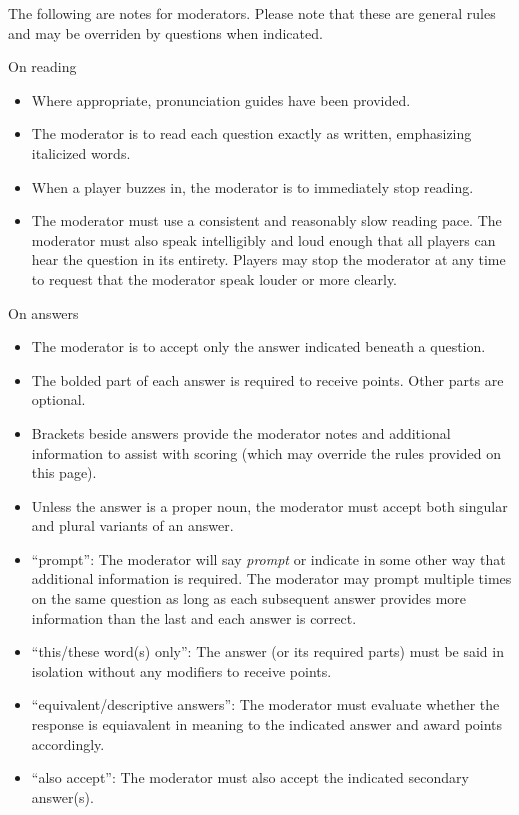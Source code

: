 \thispagestyle{empty}
The following are notes for moderators. Please note that these are general rules and may be overriden by questions when indicated.

\vspace*{0.3 cm}
On reading
\begin{itemize}
    \item Where appropriate, pronunciation guides have been provided.
    \item The moderator is to read each question exactly as written, emphasizing italicized words.
    \item When a player buzzes in, the moderator is to immediately stop reading.
    \item The moderator must use a consistent and reasonably slow reading pace. The moderator must also speak intelligibly and loud enough that all players can hear the question in its entirety. Players may stop the moderator at any time to request that the moderator speak louder or more clearly.
\end{itemize}

\vspace*{0.3 cm}
On answers
\begin{itemize}
    \item The moderator is to accept only the answer indicated beneath a question.
    \item The bolded part of each answer is required to receive points. Other parts are optional.
    \item Brackets beside answers provide the moderator notes and additional information to assist with scoring (which may override the rules provided on this page).
    \item Unless the answer is a proper noun, the moderator must accept both singular and plural variants of an answer. 
    \item ``prompt'': The moderator will say \textit{prompt} or indicate in some other way that additional information is required. The moderator may prompt multiple times on the same question as long as each subsequent answer provides more information than the last and each answer is correct.
    \item ``this/these word(s) only'': The answer (or its required parts) must be said in isolation without any modifiers to receive points.
    \item ``equivalent/descriptive answers'': The moderator must evaluate whether the response is equiavalent in meaning to the indicated answer and award points accordingly.
    \item ``also accept'': The moderator must also accept the indicated secondary answer(s).
\end{itemize}

